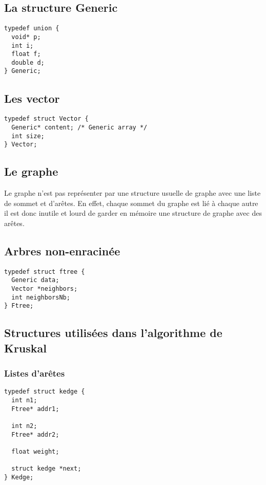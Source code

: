 \documentclass[a4paper]{article}
\begin{document}
\subsection{La structure Generic}

\begin{verbatim}
typedef union {
  void* p;
  int i;
  float f;
  double d;
} Generic;
\end{verbatim}

\subsection{Les vector}

\begin{verbatim}
typedef struct Vector {
  Generic* content; /* Generic array */
  int size;
} Vector;
\end{verbatim}

\subsection{Le graphe}

Le graphe n'est pas représenter par une structure usuelle de graphe avec une liste de sommet et d'arêtes. En effet, chaque sommet du graphe est lié à chaque autre il est donc inutile et lourd de garder en mémoire une structure de graphe avec des arêtes.

\subsection{Arbres non-enracinée}

\begin{verbatim}
typedef struct ftree {
  Generic data;
  Vector *neighbors;
  int neighborsNb;
} Ftree;
\end{verbatim}

\subsection{Structures utilisées dans l'algorithme de Kruskal}

\subsubsection{Listes d'arêtes}

\begin{verbatim}
typedef struct kedge {
  int n1;
  Ftree* addr1;

  int n2;
  Ftree* addr2;

  float weight;

  struct kedge *next;
} Kedge;
\end{verbatim}
\end{document}
